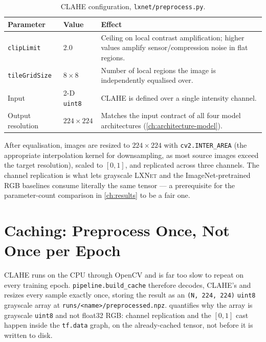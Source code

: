 \documentclass[11pt,a4paper,oneside]{report}
\newcommand{\LXNet}{\textsc{LXNet}}
\newcommand{\code}[1]{\texttt{\small #1}}
\begin{document}
\begin{table}[h]
\centering
\small
\begin{tabularx}{\linewidth}{@{}ll X@{}}
\toprule
\textbf{Parameter} & \textbf{Value} & \textbf{Effect} \\
\midrule
\code{clipLimit} & 2.0 & Ceiling on local contrast amplification; higher
  values amplify sensor/compression noise in flat regions. \\
\code{tileGridSize} & $8\times 8$ & Number of local regions the image is
  independently equalised over. \\
Input & 2-D \code{uint8} & CLAHE is defined over a single intensity channel. \\
Output resolution & $224\times 224$ & Matches the input contract of all four
  model architectures (\cref{ch:architecture-model}). \\
\bottomrule
\end{tabularx}
\caption{CLAHE configuration, \texttt{lxnet/preprocess.py}.}
\label{tab:clahe-params}
\end{table}

After equalisation, images are resized to $224\times224$ with
\code{cv2.INTER\_AREA} (the appropriate interpolation kernel for
downsampling, as most source images exceed the target resolution), scaled to
$[0,1]$, and replicated across three channels. The channel replication is
what lets grayscale \LXNet{} and the ImageNet-pretrained RGB baselines
consume literally the same tensor --- a prerequisite for the parameter-count
comparison in \cref{ch:results} to be a fair one.

\section{Caching: Preprocess Once, Not Once per Epoch}
\label{sec:caching}

CLAHE runs on the CPU through OpenCV and is far too slow to repeat on every
training epoch. \code{pipeline.build\_cache} therefore decodes, CLAHE's and
resizes every sample exactly once, storing the result as an \code{(N, 224,
224)} \code{uint8} grayscale array at \texttt{runs/<name>/preprocessed.npz}.
 quantifies why the array is grayscale \code{uint8} and
not float32 RGB: channel replication and the $[0,1]$ cast happen inside the
\code{tf.data} graph, on the already-cached tensor, not before it is written
to disk.
\end{document}
